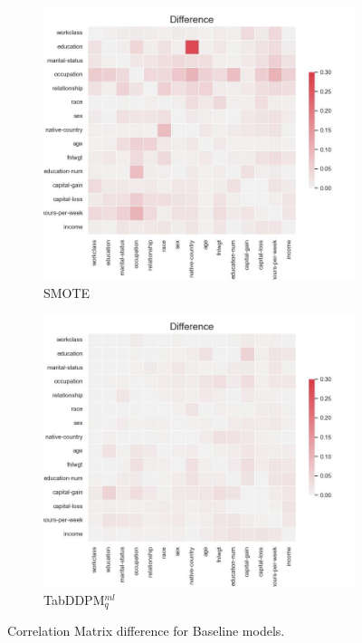 \begin{figure}[h]
\begin{subfigure}{0.3\textwidth}
	\end{subfigure}
	\begin{subfigure}{0.3\textwidth}
		\includegraphics[width=\textwidth]{images/correlation_difference/smote.jpg}
		\caption{SMOTE}

	\end{subfigure}
	\begin{subfigure}{0.3\textwidth}
		\includegraphics[width=\textwidth]{images/correlation_difference/tab-ddpm.jpg}
		\caption{TabDDPM$^{ml}_q$}

	\end{subfigure}
	\caption{Correlation Matrix difference for Baseline models.}
	\label{fig:corr_base}
\end{figure}


